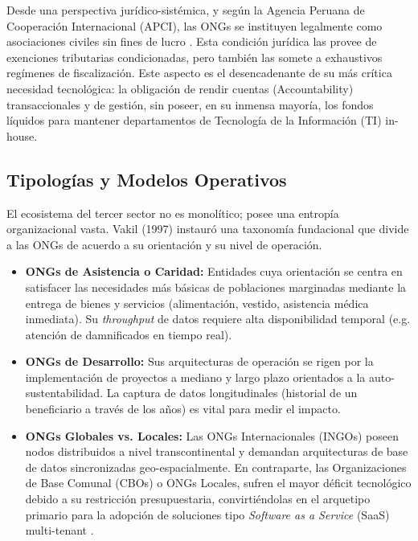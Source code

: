 \documentclass[11pt,a4paper,oneside]{report}
\begin{document}
Desde una perspectiva jur\'idico-sist\'emica, y seg\'un la Agencia Peruana de Cooperaci\'on Internacional (APCI), las ONGs se instituyen legalmente como asociaciones civiles sin fines de lucro \citep{apci2024}. Esta condici\'on jur\'idica las provee de exenciones tributarias condicionadas, pero tambi\'en las somete a exhaustivos reg\'imenes de fiscalizaci\'on. Este aspecto es el desencadenante de su m\'as cr\'itica necesidad tecnol\'ogica: la obligaci\'on de rendir cuentas (Accountability) transaccionales y de gesti\'on, sin poseer, en su inmensa mayor\'ia, los fondos l\'iquidos para mantener departamentos de Tecnolog\'ia de la Informaci\'on (TI) in-house.

\subsection{Tipolog\'ias y Modelos Operativos}
El ecosistema del tercer sector no es monol\'itico; posee una entrop\'ia organizacional vasta. Vakil (1997) instaur\'o una taxonom\'ia fundacional que divide a las ONGs de acuerdo a su orientaci\'on y su nivel de operaci\'on. 

\begin{itemize}
    \item \textbf{ONGs de Asistencia o Caridad:} Entidades cuya orientaci\'on se centra en satisfacer las necesidades m\'as b\'asicas de poblaciones marginadas mediante la entrega de bienes y servicios (alimentaci\'on, vestido, asistencia m\'edica inmediata). Su \textit{throughput} de datos requiere alta disponibilidad temporal (e.g. atenci\'on de damnificados en tiempo real).
    \item \textbf{ONGs de Desarrollo:} Sus arquitecturas de operaci\'on se rigen por la implementaci\'on de proyectos a mediano y largo plazo orientados a la auto-sustentabilidad. La captura de datos longitudinales (historial de un beneficiario a trav\'es de los a\~nos) es vital para medir el impacto.
    \item \textbf{ONGs Globales vs. Locales:} Las ONGs Internacionales (INGOs) poseen nodos distribuidos a nivel transcontinental y demandan arquitecturas de base de datos sincronizadas geo-espacialmente. En contraparte, las Organizaciones de Base Comunal (CBOs) o ONGs Locales, sufren el mayor d\'eficit tecnol\'ogico debido a su restricci\'on presupuestaria, convirti\'endolas en el arquetipo primario para la adopci\'on de soluciones tipo \textit{Software as a Service} (SaaS) multi-tenant \citep{bezemer2010}.
\end{itemize}
\end{document}
